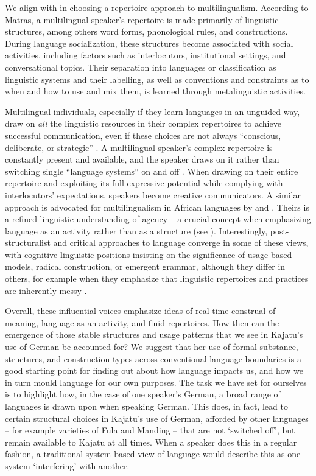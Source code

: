 \documentclass[output=paper]{langscibook}
\begin{document}
We align with \citet[4ff]{matras_language_2020} in choosing a repertoire approach to multilingualism. According to Matras, a multilingual speaker’s repertoire is made primarily of linguistic structures, among others word forms, phonological rules, and constructions. During language socialization, these structures become associated with social activities, including factors such as interlocutors, institutional settings, and conversational topics. Their separation into languages or classification as linguistic systems and their labelling, as well as conventions and constraints as to when and how to use and mix them, is learned through metalinguistic activities. 


Multilingual individuals, especially if they learn languages in an unguided way, draw on \textit{all} the linguistic resources in their complex repertoires to achieve successful communication, even if these choices are not always “conscious, deliberate, or strategic” \citep[7]{matras_language_2020}. A multilingual speaker’s complex repertoire is constantly present and available, and the speaker draws on it rather than switching single “language systems” on and off \citep[9]{matras_language_2020}. When drawing on their entire repertoire and exploiting its full expressive potential while complying with interlocutors’ expectations, speakers become creative communicators. A similar approach is advocated for multilingualism in African languages by \citet{lupke_repertoires_2013} and \citet{storch_communicative_2016}. Theirs is a refined linguistic understanding of agency – a crucial concept when emphasizing language as an activity rather than as a structure (see \citealt{pennycook_language_2010}). Interestingly, post-structuralist and critical approaches to language \citep{makoni_disinventing_2007, makoni_disinventing_2012,pennycook_repertoires_2018} converge in some of these views, with cognitive linguistic positions insisting on the significance of usage-based models, radical construction, or emergent grammar, although they differ in others, for example when they emphasize that linguistic repertoires and practices are inherently messy \citep{storch_communicative_2016}. 

\hspace*{-1.5pt}Overall, these influential voices emphasize ideas of real-time construal of meaning, language as an activity, and fluid repertoires. How then can the emergence of those stable structures and usage patterns that we see in Kajatu’s use of German be accounted for? We suggest that her use of formal substance, structures, and construction types across conventional language boundaries is a good starting point for finding out about how language impacts us, and how we in turn mould language for our own purposes. The task we have set for ourselves is to highlight how, in the case of one speaker’s German, a broad range of languages is drawn upon when speaking German. This does, in fact, lead to certain structural choices in Kajatu’s use of German, afforded by other languages – for example varieties of Fula and Manding – that are not ‘switched off’, but remain available to Kajatu at all times. When a speaker does this in a regular fashion, a traditional system-based view of language would describe this as one system ‘interfering’ with another.
\end{document}
